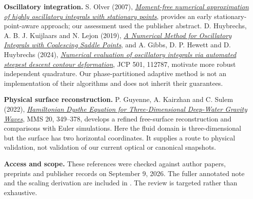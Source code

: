 \documentclass[10pt,letterpaper]{article}
\numberwithin{equation}{section}
\begin{document}
\textbf{Oscillatory integration.} S. Olver (2007),
\href{https://www.cambridge.org/core/journals/european-journal-of-applied-mathematics/article/abs/momentfree-numerical-approximation-of-highly-oscillatory-integrals-with-stationary-points/0E02A1874E775BB219E5A2CE2DC0221B}{\emph{Moment-free numerical approximation of highly oscillatory integrals with stationary points}},
provides an early stationary-point-aware approach; our assessment used the publisher abstract.
D. Huybrechs, A. B. J. Kuijlaars and N. Lejon (2019),
\href{https://arxiv.org/abs/1806.06549}{\emph{A Numerical Method for Oscillatory Integrals
with Coalescing Saddle Points}}, and A. Gibbs, D. P. Hewett and D. Huybrechs (2024),
\href{https://arxiv.org/abs/2307.07261}{\emph{Numerical evaluation of oscillatory integrals
via automated steepest descent contour deformation}}, JCP 501, 112787, motivate
more robust independent quadrature. Our phase-partitioned adaptive method is not
an implementation of their algorithms and does not inherit their guarantees.

\textbf{Physical surface reconstruction.} P. Guyenne, A. Kairzhan and C. Sulem
(2022), \href{https://doi.org/10.1137/21M1432788}{\emph{Hamiltonian Dysthe Equation for
Three-Dimensional Deep-Water Gravity Waves}}, MMS 20, 349--378, develops a refined
free-surface reconstruction and comparisons with Euler simulations. Here the
fluid domain is three-dimensional but the surface has two horizontal coordinates.
It supplies a route to physical validation, not validation of our current optical
or canonical snapshots.

\textbf{Access and scope.} These references were checked against author papers,
preprints and publisher records on September 9, 2026. The fuller annotated note
and the scaling derivation are included in .
The review is targeted rather than exhaustive.
\end{document}
